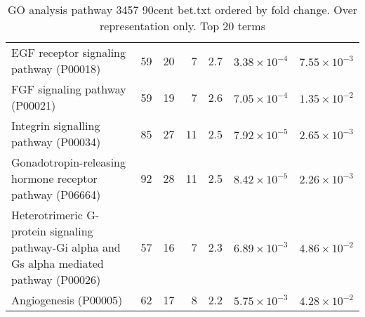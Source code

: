\begin{table}[ht]
\begin{adjustbox}{width=\textwidth}
\begin{tabular}{lrrrrrr}
  EGF receptor signaling pathway (P00018) & 59 & 20 & 7 & 2.7 & $3.38 \times 10^{-4}$ & $7.55 \times 10^{-3}$ \\ 
  FGF signaling pathway (P00021) & 59 & 19 & 7 & 2.6 & $7.05 \times 10^{-4}$ & $1.35 \times 10^{-2}$ \\ 
  Integrin signalling pathway (P00034) & 85 & 27 & 11 & 2.5 & $7.92 \times 10^{-5}$ & $2.65 \times 10^{-3}$ \\ 
  Gonadotropin-releasing hormone receptor pathway (P06664) & 92 & 28 & 11 & 2.5 & $8.42 \times 10^{-5}$ & $2.26 \times 10^{-3}$ \\ 
  Heterotrimeric G-protein signaling pathway-Gi alpha and Gs alpha mediated pathway (P00026) & 57 & 16 & 7 & 2.3 & $6.89 \times 10^{-3}$ & $4.86 \times 10^{-2}$ \\ 
  Angiogenesis (P00005) & 62 & 17 & 8 & 2.2 & $5.75 \times 10^{-3}$ & $4.28 \times 10^{-2}$ \\ 
   \hline
\end{tabular}
\end{adjustbox}
\caption{GO analysis pathway 3457 90cent bet.txt ordered by fold change. Over representation only. Top 20 terms} 
\label{tab:GO analysis pathway 3457 90cent bet.txt ordered by fold change. Over representation only. Top 20 terms}
\end{table}

